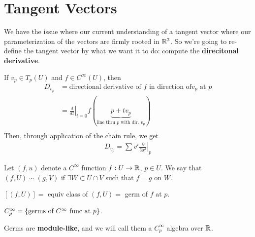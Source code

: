 \documentclass[12pt, twosided]{article}
\begin{document}
\section{Tangent Vectors}

We have the issue where our current understanding of a tangent vector where our parameterization of the vectors are firmly rooted in \(\mathbb{R}^3\). So we're going to re-define the tangent vector by what we want it to do: compute the \textbf{direcitonal derivative}.

\begin{idea}
  If \(v_p \in T_p(U)\) and \(f \in C^\infty (U)\), then
  \begin{align*}
    D_{v_p} &= \text{directional derivative of } f \text{ in direction of} v_p \text{ at } p \\
            &= \left.\frac{d}{dt}\right\vert_{t=0} f(\underbrace{p + tv_p}_{\text{line thru } p \text{ with dir. } v_p}) \\
  \end{align*}
  Then, through application of the chain rule, we get
  \begin{align}
    D_{v_p} = \sum v^i \left.\frac{\partial}{\partial x^i}\right\vert_{p}
  \end{align}
\end{idea}

\begin{df}
  Let \((f, u)\) denote a \(C^\infty\) function \(f: U \to \mathbb{R}\), \(p \in U\). We say that \((f, U) \sim (g, V)\) if \(\exists W \subset U \cap V\) such that \(f = g\) on \(W\).
\end{df}

\begin{notn}
  \([(f, U)] = \) equiv class of \((f, U) = \) germ of \(f\) at \(p\).

  \(C_p^\infty = \left\{ \text{germs of } C^\infty\ \text{func at } p\right\}\).
\end{notn}

\begin{lm}
  Germs are \textbf{module-like}, and we will call them a \(C_p^\infty\) algebra over \(\mathbb{R}\).
\end{lm}
\end{document}
